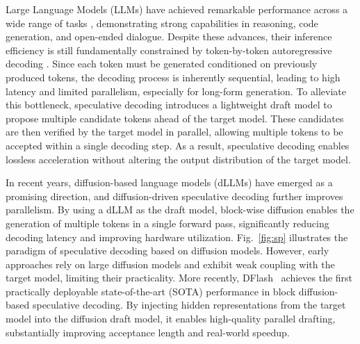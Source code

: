 \documentclass{article}
\begin{document}
Large Language Models (LLMs) \cite{touvron2023open,yang2025qwen3,chiang2023vicuna} have achieved remarkable performance across a wide range of tasks \citep{annepaka2025large,hadi2023large}, demonstrating strong capabilities in reasoning, code generation, and open-ended dialogue. Despite these advances, their inference efficiency is still fundamentally constrained by token-by-token autoregressive decoding \cite{tay2022efficient,papa2024survey,wan2023efficient}. Since each token must be generated conditioned on previously produced tokens, the decoding process is inherently sequential, leading to high latency and limited parallelism, especially for long-form generation. To alleviate this bottleneck, speculative decoding \cite{leviathan2023fastinferencetransformersspeculative, li2025eaglespeculativesamplingrequires, li2024eagle2fasterinferencelanguage, li2025eagle3scalinginferenceacceleration, cai2024medusasimplellminference} introduces a lightweight draft model to propose multiple candidate tokens ahead of the target model. These candidates are then verified by the target model in parallel, allowing multiple tokens to be accepted within a single decoding step. As a result, speculative decoding enables lossless acceleration without altering the output distribution of the target model.




In recent years, diffusion-based language models (dLLMs) \cite{nie2025largelanguagediffusionmodels, arriola2025blockdiffusioninterpolatingautoregressive, wu2025fastdllmv2efficientblockdiffusion, cheng2025sdarsynergisticdiffusionautoregressionparadigm} have emerged as a promising direction, and diffusion-driven speculative decoding further improves parallelism. By using a dLLM as the draft model, block-wise diffusion enables the generation of multiple tokens in a single forward pass, significantly reducing decoding latency and improving hardware utilization. Fig.~\ref{fig:sp} illustrates the paradigm of speculative decoding based on diffusion models. However, early approaches \cite{li2025diffuspecunlockingdiffusionlanguage,sandler2025specdiff2scalingdiffusiondrafter,samragh2025llmknowsfutureuncovering} rely on large diffusion models and exhibit weak coupling with the target model, limiting their practicality. More recently, DFlash~\cite{chen2026dflash} achieves the first practically deployable state-of-the-art (SOTA) performance in block diffusion-based speculative decoding. By injecting hidden representations from the target model into the diffusion draft model, it enables high-quality parallel drafting, substantially improving acceptance length and real-world speedup. 
\end{document}
